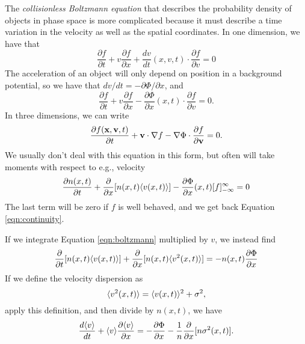 \documentclass[]{article}
\begin{document}
The {\it collisionless Boltzmann equation} that describes the probability density 
of objects in phase space is more complicated because it must describe a time variation
in the velocity as well as the spatial coordinates.  In one dimension, we have that
\begin{equation}
\frac{\partial f}{\partial t} + v\frac{\partial f}{\partial x} + \frac{dv}{dt}(x,v,t) \cdot \frac{\partial f}{\partial v} = 0
\end{equation}
\noindent
The acceleration of an object will only depend on position in a background potential, so
we have that $dv/dt = -\partial \Phi/\partial x$, and
\begin{equation}
\label{eqn:boltzmann}
\frac{\partial f}{\partial t} + v \frac{\partial f}{\partial x} - \frac{\partial \Phi}{\partial x}(x,t)\cdot \frac{\partial f}{\partial v} = 0.
\end{equation}
\noindent
In three dimensions, we can write
\begin{equation}
\label{eqn:bvec}
\frac{\partial f(\mathbf{x}, \mathbf{v}, t)}{\partial t} + \mathbf{v} \cdot \nabla f - \nabla \Phi \cdot \frac{\partial f}{\partial \mathbf{v}} = 0.
\end{equation}
\noindent
We usually don't deal with this equation in this form, but often will take moments with respect to
e.g., velocity
\begin{equation}
\frac{\partial n(x,t)}{\partial t} + \frac{\partial}{\partial x}[n(x,t)\langle v(x,t)\rangle] - \frac{\partial \Phi}{\partial x}(x,t)[f]_{-\infty}^{\infty} = 0
\end{equation}
\noindent
The last term will be zero if $f$ is well behaved, and we get back Equation \ref{eqn:continuity}.

If we integrate Equation \ref{eqn:boltzmann} multiplied by $v$, we instead find
\begin{equation}
\frac{\partial}{\partial t}[n(x,t)\langle v(x,t)\rangle] + \frac{\partial}{\partial x}[n(x,t)\langle v^2(x,t)\rangle] = - n(x,t) \frac{\partial \Phi}{\partial x}
\end{equation}
\noindent
If we define the velocity dispersion as
\begin{equation}
\langle v^2(x,t)\rangle = \langle v(x,t)\rangle^2 + \sigma^2,
\end{equation}
\noindent
apply this definition, and then divide by $n(x,t)$, we have
\begin{equation}
\label{eqn:v_ave}
\frac{d\langle v\rangle}{dt} + \langle v\rangle\frac{\partial \langle v\rangle}{\partial x} = -\frac{\partial \Phi}{\partial x} - \frac{1}{n}\frac{\partial}{\partial x}[n\sigma^2(x,t)].
\end{equation}
\end{document}
